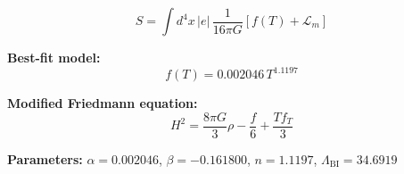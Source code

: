 
\begin{equation}
  S = \int d^4x \, |e| \, \frac{1}{16\pi G} \left[ f(T) + \mathcal{L}_m \right]
\end{equation}

\textbf{Best-fit model:}
\begin{equation}
  f(T) = 0.002046 \, T^{1.1197}
\end{equation}

\textbf{Modified Friedmann equation:}
\begin{equation}
  H^2 = \frac{8\pi G}{3} \rho - \frac{f}{6} + \frac{T f_T}{3}
\end{equation}

\textbf{Parameters:}
$\alpha = 0.002046$, \quad
$\beta = -0.161800$, \quad
$n = 1.1197$, \quad
$\Lambda_{\text{BI}} = 34.6919$